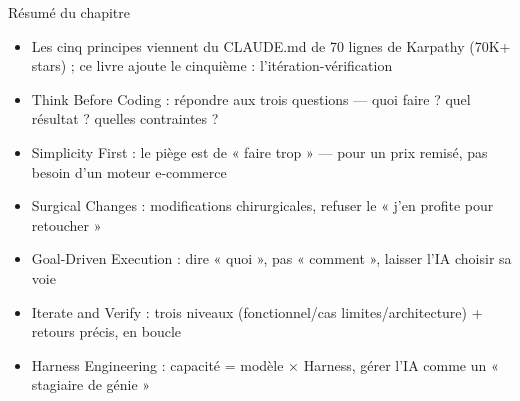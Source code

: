 \begin{tcbsummary}{Résumé du chapitre}
\begin{itemize}
  \item Les cinq principes viennent du CLAUDE.md de 70 lignes de Karpathy (70K+ stars) ; ce livre ajoute le cinquième : l'itération-vérification
  \item Think Before Coding : répondre aux trois questions — quoi faire ? quel résultat ? quelles contraintes ?
  \item Simplicity First : le piège est de « faire trop » — pour un prix remisé, pas besoin d'un moteur e-commerce
  \item Surgical Changes : modifications chirurgicales, refuser le « j'en profite pour retoucher »
  \item Goal-Driven Execution : dire « quoi », pas « comment », laisser l'IA choisir sa voie
  \item Iterate and Verify : trois niveaux (fonctionnel/cas limites/architecture) + retours précis, en boucle
  \item Harness Engineering : capacité = modèle × Harness, gérer l'IA comme un « stagiaire de génie »
\end{itemize}

\end{tcbsummary}
